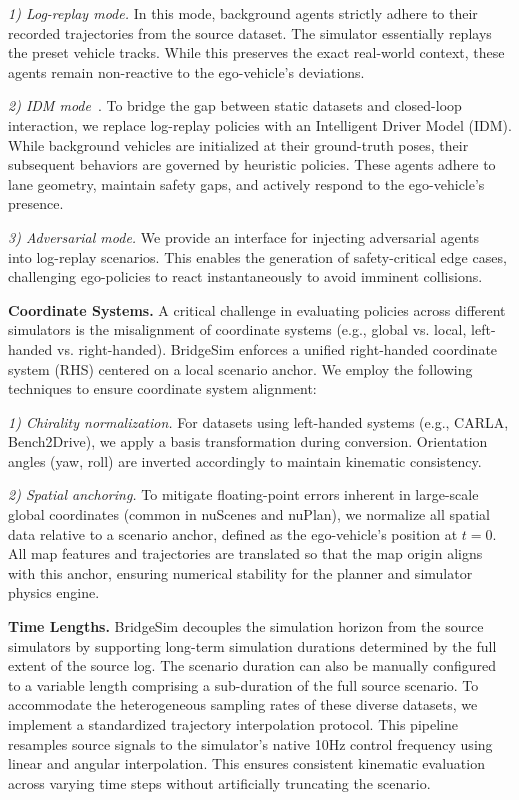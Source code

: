 \documentclass{article}
\begin{document}
\textit{1) Log-replay mode.} In this mode, background agents strictly adhere to their recorded trajectories from the source dataset. The simulator essentially replays the preset vehicle tracks. While this preserves the exact real-world context, these agents remain non-reactive to the ego-vehicle's deviations.

\textit{2) IDM mode}~\cite{idm}. To bridge the gap between static datasets and closed-loop interaction, we replace log-replay policies with an Intelligent Driver Model (IDM). While background vehicles are initialized at their ground-truth poses, their subsequent behaviors are governed by heuristic policies. These agents adhere to lane geometry, maintain safety gaps, and actively respond to the ego-vehicle's presence.

\textit{3) Adversarial mode.} We provide an interface for injecting adversarial agents~\cite{advbmt} into log-replay scenarios. This enables the generation of safety-critical edge cases, challenging ego-policies to react instantaneously to avoid imminent collisions.

\textbf{Coordinate Systems.} A critical challenge in evaluating policies across different simulators is the misalignment of coordinate systems (e.g., global vs. local, left-handed vs. right-handed). BridgeSim enforces a unified right-handed coordinate system (RHS) centered on a local scenario anchor. We employ the following techniques to ensure coordinate system alignment:

\textit{1) Chirality normalization.} For datasets using left-handed systems (e.g., CARLA, Bench2Drive), we apply a basis transformation during conversion. Orientation angles (yaw, roll) are inverted accordingly to maintain kinematic consistency.

\textit{2) Spatial anchoring.} To mitigate floating-point errors inherent in large-scale global coordinates (common in nuScenes and nuPlan), we normalize all spatial data relative to a scenario anchor, defined as the ego-vehicle's position at $t=0$. All map features and trajectories are translated so that the map origin aligns with this anchor, ensuring numerical stability for the planner and simulator physics engine.

\textbf{Time Lengths.} BridgeSim decouples the simulation horizon from the source simulators by supporting long-term simulation durations determined by the full extent of the source log. The scenario duration can also be manually configured to a variable length comprising a sub-duration of the full source scenario. To accommodate the heterogeneous sampling rates of these diverse datasets, we implement a standardized trajectory interpolation protocol. This pipeline resamples source signals to the simulator’s native 10Hz control frequency using linear and angular interpolation. This ensures consistent kinematic evaluation across varying time steps without artificially truncating the scenario.
\end{document}
